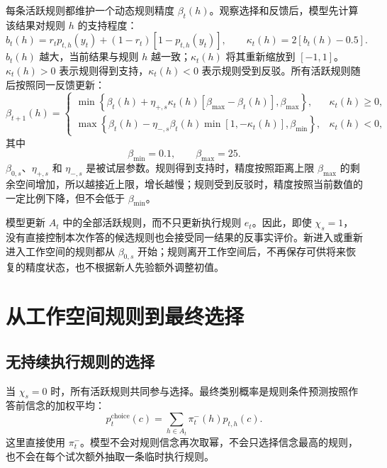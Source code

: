 \documentclass[12pt]{article}
\begin{document}
每条活跃规则都维护一个动态规则精度 $\beta_t(h)$。观察选择和反馈后，模型先计算该结果对规则 $h$ 的支持程度：
\begin{equation}
b_t(h)
=r_t p_{t,h}(y_t)
+(1-r_t)[1-p_{t,h}(y_t)],
\qquad
\kappa_t(h)=2[b_t(h)-0.5].
\label{eq:beta-evidence}
\end{equation}
$b_t(h)$ 越大，当前结果与规则 $h$ 越一致；$\kappa_t(h)$ 将其重新缩放到 $[-1,1]$。$\kappa_t(h)>0$ 表示规则得到支持，$\kappa_t(h)<0$ 表示规则受到反驳。所有活跃规则随后按照同一反馈更新：
\begin{equation}
\beta_{t+1}(h)=
\begin{cases}
\min\!\left\{
\beta_t(h)+\eta_{+,s}\kappa_t(h)
[\beta_{\max}-\beta_t(h)],
\beta_{\max}
\right\},
&\kappa_t(h)\geq0,\\[6pt]
\max\!\left\{
\beta_t(h)-\eta_{-,s}\beta_t(h)
\min[1,-\kappa_t(h)],
\beta_{\min}
\right\},
&\kappa_t(h)<0,
\end{cases}
\label{eq:beta-update}
\end{equation}
其中
\begin{equation}
\beta_{\min}=0.1,
\qquad
\beta_{\max}=25.
\label{eq:beta-bounds}
\end{equation}
$\beta_{0,s}$、$\eta_{+,s}$ 和 $\eta_{-,s}$ 是被试层参数。规则得到支持时，精度按照距离上限 $\beta_{\max}$ 的剩余空间增加，所以越接近上限，增长越慢；规则受到反驳时，精度按照当前数值的一定比例下降，但不会低于 $\beta_{\min}$。

模型更新 $A_t$ 中的全部活跃规则，而不只更新执行规则 $e_t$。因此，即使 $\chi_s=1$，没有直接控制本次作答的候选规则也会接受同一结果的反事实评价。新进入或重新进入工作空间的规则都从 $\beta_{0,s}$ 开始；规则离开工作空间后，不再保存可供将来恢复的精度状态，也不根据新人先验额外调整初值。


\section{从工作空间规则到最终选择}

\subsection{无持续执行规则的选择}

当 $\chi_s=0$ 时，所有活跃规则共同参与选择。最终类别概率是规则条件预测按照作答前信念的加权平均：
\begin{equation}
p_t^{\mathrm{choice}}(c)
=\sum_{h\in A_t}\pi_t^{-}(h)p_{t,h}(c).
\label{eq:choice-execution-off}
\end{equation}
这里直接使用 $\pi_t^{-}$。模型不会对规则信念再次取幂，不会只选择信念最高的规则，也不会在每个试次额外抽取一条临时执行规则。
\end{document}
